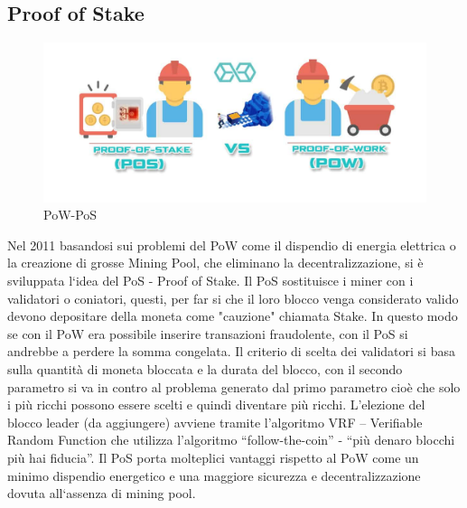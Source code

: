 \documentclass[11pt,a4paper,titlepage,twoside,openright]{report}
\begin{document}
\subsection{Proof of Stake}
\begin{figure}[h]
	\includegraphics[width=\textwidth]{pow-pos}
	\centering
	\caption{PoW-PoS}
	\label{fig:pow-pos}
\end{figure}

Nel 2011 basandosi sui problemi del PoW come il dispendio di energia elettrica o la creazione di grosse Mining Pool, che eliminano la decentralizzazione, si è sviluppata l`idea del PoS - Proof of Stake. Il PoS sostituisce i miner con i validatori o coniatori, questi, per far si che il loro blocco venga considerato valido devono depositare della moneta come "cauzione" chiamata Stake.
In questo modo se con il PoW era possibile inserire transazioni fraudolente, con il PoS si andrebbe a perdere la somma congelata. Il criterio di scelta dei validatori si basa sulla quantità di moneta bloccata e la durata del blocco, con il secondo parametro si va in contro al problema generato dal primo parametro cioè che solo i più ricchi possono essere scelti e quindi diventare più ricchi.
L’elezione del blocco leader (da aggiungere) avviene tramite l’algoritmo VRF – Verifiable Random Function che utilizza l’algoritmo “follow-the-coin” - “più denaro blocchi più hai fiducia”. Il PoS porta molteplici vantaggi rispetto al PoW come un minimo dispendio energetico e una maggiore sicurezza e decentralizzazione dovuta all`assenza di mining pool.
\end{document}
